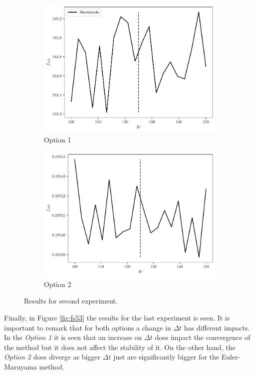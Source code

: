 \documentclass[11pt]{article}
\theoremstyle{definition}
\theoremstyle{remark}
\theoremstyle{remark}
\begin{document}
\begin{figure}[]
  \centering
  \begin{subfigure}[b]{0.45\textwidth}
    \centering
    \includegraphics[scale=.5]{../plts/fifth_b_sens_opt1}
    \caption{Option 1}
  \end{subfigure}
  \begin{subfigure}[b]{0.45\textwidth}
    \centering
    \includegraphics[scale=.5]{../plts/fifth_b_sens_opt2}
    \caption{Option 2}
  \end{subfigure}
  \caption{Results for second experiment.}
  \label{fig:fs52}
\end{figure}

Finally, in Figure \ref{fig:fs53} the results for the last experiment is seen.
It is important to remark that for both options a change in $\Delta t$ has
different impacts. In the \textit{Option 1} it is seen that an increase on
$\Delta t$ does impact the convergence of the method but it does not affect the
stability of it. On the other hand, the \textit{Option 2} does diverge as bigger
$\Delta t$ just are significantly bigger for the Euler-Maruyama method.
\end{document}
